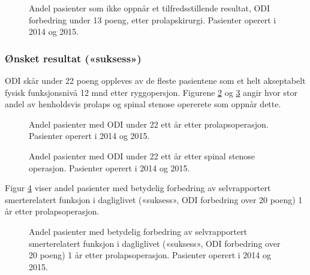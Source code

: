 \documentclass [norsk,a4paper,twoside]{article}\usepackage[]{graphicx}\usepackage[]{color}
\begin{document}
\begin{figure}[ht]
\caption{\label{fig:OswEndrLav}   Andel pasienter som ikke oppnår et tilfredsstillende resultat, ODI
forbedring under 13 poeng, etter prolapskirurgi. Pasienter operert i 2014 og 2015.}
\end{figure}




















\subsubsection{Ønsket resultat («suksess»)}
ODI skår  under 22 poeng oppleves av de fleste pasientene som et helt akseptabelt fysisk funksjonsnivå 12 mnd etter ryggopersjon. Figurene \ref{fig:Osw22Pro} og \ref{fig:Osw22SS} angir hvor stor andel av henholdsvis prolaps og spinal stenose opererete som oppnår dette.

\begin{figure}[ht]
\caption{\label{fig:Osw22Pro}   Andel pasienter med ODI under 22 ett år
etter prolapsoperasjon. Pasienter operert i 2014 og 2015.}
\end{figure}

\begin{figure}[ht]
\caption{\label{fig:Osw22SS}   Andel pasienter med ODI under 22 ett år
etter spinal stenose operasjon. Pasienter operert i 2014 og 2015.}
\end{figure}



Figur \ref{fig:OswEndr20} viser andel pasienter med betydelig forbedring av selvrapportert
smerterelatert funksjon i dagliglivet («suksess», ODI forbedring over 20 poeng) 1 år
etter prolapsoperasjon.

\begin{figure}[ht]
\caption{\label{fig:OswEndr20}   Andel pasienter med betydelig forbedring av selvrapportert
smerterelatert funksjon i dagliglivet («suksess», ODI forbedring over 20 poeng) 1 år
etter prolapsoperasjon. Pasienter operert i 2014 og 2015.}
\end{figure}
\end{document}
